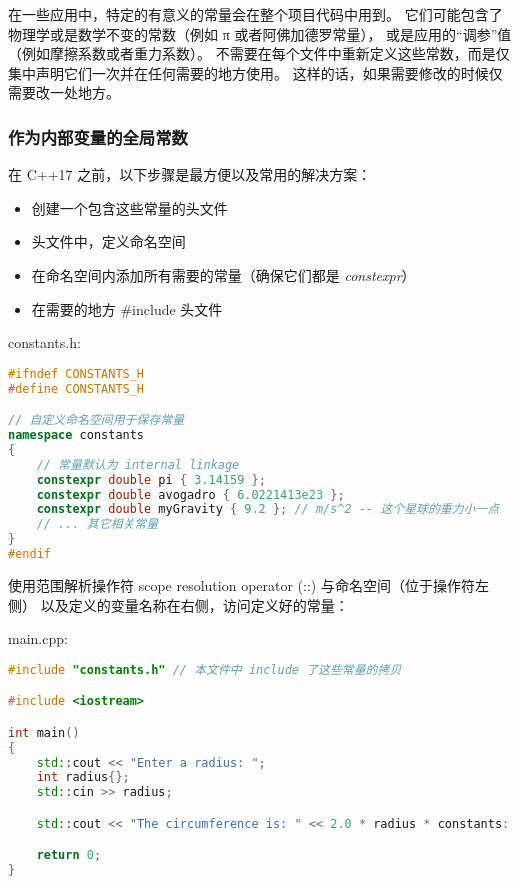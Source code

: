 \documentclass[../../LearnCpp.tex]{subfiles}
\begin{document}

在一些应用中，特定的有意义的常量会在整个项目代码中用到。
它们可能包含了物理学或是数学不变的常数（例如 π 或者阿佛加德罗常量），
或是应用的“调参”值（例如摩擦系数或者重力系数）。
不需要在每个文件中重新定义这些常数，而是仅集中声明它们一次并在任何需要的地方使用。
这样的话，如果需要修改的时候仅需要改一处地方。

\subsubsection*{作为内部变量的全局常数}

在 C++17 之前，以下步骤是最方便以及常用的解决方案：

\begin{itemize}
    \item 创建一个包含这些常量的头文件
    \item 头文件中，定义命名空间
    \item 在命名空间内添加所有需要的常量（确保它们都是 \textit{constexpr}）
    \item 在需要的地方 \#include 头文件
\end{itemize}

constants.h:

\begin{lstlisting}[language=C++]
#ifndef CONSTANTS_H
#define CONSTANTS_H

// 自定义命名空间用于保存常量
namespace constants
{
    // 常量默认为 internal linkage
    constexpr double pi { 3.14159 };
    constexpr double avogadro { 6.0221413e23 };
    constexpr double myGravity { 9.2 }; // m/s^2 -- 这个星球的重力小一点
    // ... 其它相关常量
}
#endif
\end{lstlisting}

使用范围解析操作符 scope resolution operator (::) 与命名空间（位于操作符左侧）
以及定义的变量名称在右侧，访问定义好的常量：

main.cpp:

\begin{lstlisting}[language=C++]
#include "constants.h" // 本文件中 include 了这些常量的拷贝

#include <iostream>

int main()
{
    std::cout << "Enter a radius: ";
    int radius{};
    std::cin >> radius;

    std::cout << "The circumference is: " << 2.0 * radius * constants::pi << '\n';

    return 0;
}
\end{lstlisting}
\end{document}

